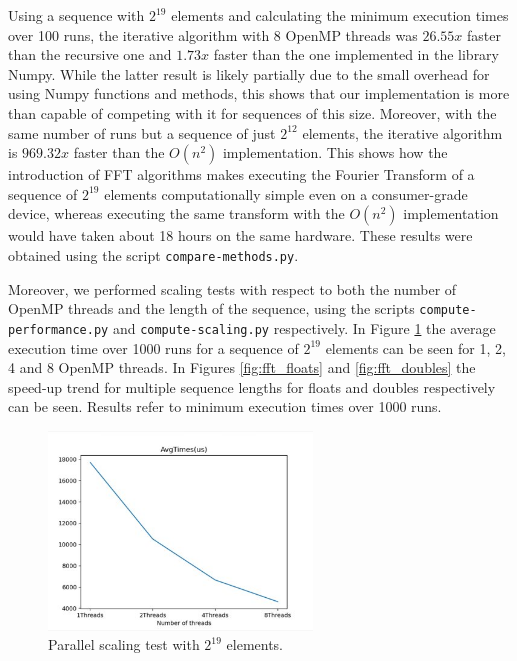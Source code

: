 Using a sequence with $2^{19}$ elements and calculating the minimum execution times over 100 runs, the iterative algorithm with 8 OpenMP threads was $26.55x$ faster than the recursive one and $1.73x$ faster than the one implemented in the library Numpy. While the latter result is likely partially due to the small overhead for using Numpy functions and methods, this shows that our implementation is more than capable of competing with it for sequences of this size. Moreover, with the same number of runs but a sequence of just $2^{12}$ elements, the iterative algorithm is $969.32x$ faster than the $O(n^2)$ implementation. This shows how the introduction of FFT algorithms makes executing the Fourier Transform of a sequence of $2^{19}$ elements computationally simple even on a consumer-grade device, whereas executing the same transform with the $O(n^2)$ implementation would have taken about 18 hours on the same hardware. These results were obtained using the script \texttt{compare-methods.py}.

Moreover, we performed scaling tests with respect to both the number of OpenMP threads and the length of the sequence, using the scripts \texttt{compute\--performance.py} and \texttt{compute\--scaling.py} respectively. In Figure \ref{fig:fft_threads} the average execution time over 1000 runs for a sequence of $2^{19}$ elements can be seen for 1, 2, 4 and 8 OpenMP threads. In Figures \ref{fig:fft_floats} and \ref{fig:fft_doubles} the speed-up trend for multiple sequence lengths for floats and doubles respectively can be seen. Results refer to minimum execution times over 1000 runs.

\begin{figure}[ht]
    \centering
    \includegraphics[width=70mm]{image/fft_times}
    \caption{Parallel scaling test with $2^{19}$ elements.}
    \label{fig:fft_threads}
\end{figure}

